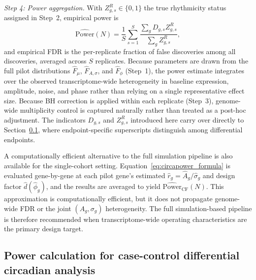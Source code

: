 \documentclass{article}
\begin{document}
\emph{Step 4: Power aggregation.}
With $Z_{g,s}^R\in\{0,1\}$ the true rhythmicity status assigned in Step~2,
empirical power is
\[
\widehat{\mathrm{Power}}(N)
=
\frac{1}{S}\sum_{s=1}^S
\frac{\sum_g D_{g,s}Z_{g,s}^R}{\sum_g Z_{g,s}^R},
\]
and empirical FDR is the per-replicate fraction of false discoveries among all
discoveries, averaged across $S$ replicates. Because parameters are drawn from
the full pilot distributions $\hat{F}_\mu$, $\hat{F}_{A,\sigma}$, and $\hat{F}_\phi$
(Step~1), the power estimate integrates over the observed transcriptome-wide
heterogeneity in baseline expression, amplitude, noise, and phase rather than
relying on a single representative effect size. Because BH
correction is applied within each replicate (Step~3), genome-wide multiplicity
control is captured naturally rather than treated as a post-hoc adjustment.
The indicators $D_{g,s}$ and $Z_{g,s}^R$ introduced here carry over directly
to Section~\ref{sec:differential}, where endpoint-specific superscripts
distinguish among differential endpoints.

A computationally efficient alternative to the full simulation pipeline is also available for the single-cohort setting. Equation~\eqref{eq:circapower_formula}
is evaluated gene-by-gene at each pilot gene's estimated
$\hat{r}_g = \hat{A}_g/\hat{\sigma}_g$ and design factor
$\hat{d}(\hat{\phi}_g)$, and the results are averaged to yield
$\widehat{\mathrm{Power}}_{\mathrm{CF}}(N)$.
This approximation is computationally efficient, but it does not propagate
genome-wide FDR or the joint $(A_g,\sigma_g)$ heterogeneity. The full
simulation-based pipeline is therefore recommended when transcriptome-wide
operating characteristics are the primary design target.

\subsection{Power calculation for case-control differential circadian analysis}
\label{sec:differential}
\end{document}
